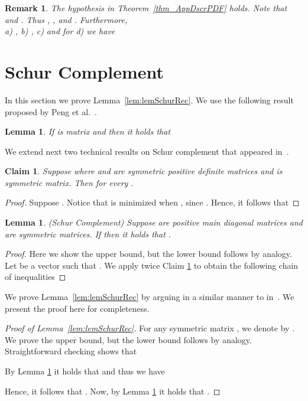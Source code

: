 \documentclass[11pt]{article}
\newcommand{\lemref}[1]{Lemma~\ref{lem:#1}}
\newtheorem{lem}[thm]{Lemma}
\newtheorem{clm}[thm]{Claim}
\newtheorem{rem}[thm]{Remark}
\numberwithin{thm}{section}
\begin{document}
\begin{rem}
The hypothesis in Theorem~\ref{thm_AppDscrPDF} holds. Note that  and . Thus  , ,  and . Furthermore,\\
a) , b) , c)  and for d) we have

\end{rem}





\section{Schur Complement}\label{appsec:ASC}


In this section we prove \lemref{lemSchurRec}. We use the following result proposed by Peng et al.~\cite{arxivCCLPT15}.

\begin{lem}
\label{lem_DPM}\cite[Lemma 4.3]{arxivCCLPT15} If  is \emph{}
matrix and 
then it holds that 
\end{lem}

We extend next two technical results on Schur complement that appeared in~\cite{PengPhd13,MP13,CCLPT15}.


\begin{clm}\label{clm_Schur}
Suppose  where  and  are symmetric positive definite matrices
and  is symmetric matrix. Then   for every .
\end{clm}

\begin{proof}
Suppose . Notice that  is minimized when , since .
Hence, it follows that 
\end{proof}

\begin{lem}
\label{lem_Schur}(Schur Complement) Suppose  are positive main diagonal matrices
and  are symmetric matrices. If  then it holds that .
\end{lem}

\begin{proof}
Here we show the upper bound, but
the lower bound follows by analogy. Let  be a vector such that
. We apply twice Claim \ref{clm_Schur}
to obtain the following chain of inequalities

\end{proof}


We prove \lemref{lemSchurRec} by arguing in a similar manner to in~\cite[Lemma 4.4]{arxivCCLPT15}. We present the proof here for completeness.

\begin{proof}[Proof of \lemref{lemSchurRec}] For any symmetric matrix , we denote
by . We prove the upper bound, but the lower bound follows by analogy.
Straightforward checking shows that

By Lemma \ref{lem_DPM} it holds that 
and thus we have

Hence, it follows that . Now, by Lemma \ref{lem_Schur} it holds that .
\end{proof}
\end{document}

